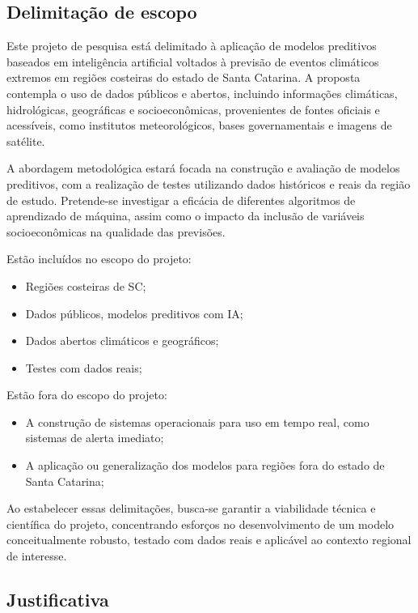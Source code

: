 \subsection{Delimitação de escopo}
\label{sec:escopo}

Este projeto de pesquisa está delimitado à aplicação de modelos preditivos baseados em inteligência artificial voltados à previsão de eventos climáticos extremos em regiões costeiras do estado de Santa Catarina. A proposta contempla o uso de dados públicos e abertos, incluindo informações climáticas, hidrológicas, geográficas e socioeconômicas, provenientes de fontes oficiais e acessíveis, como institutos meteorológicos, bases governamentais e imagens de satélite.

A abordagem metodológica estará focada na construção e avaliação de modelos preditivos, com a realização de testes utilizando dados históricos e reais da região de estudo. Pretende-se investigar a eficácia de diferentes algoritmos de aprendizado de máquina, assim como o impacto da inclusão de variáveis socioeconômicas na qualidade das previsões.

Estão incluídos no escopo do projeto:

\begin{itemize}
  \item Regiões costeiras de SC;
  \item Dados públicos, modelos preditivos com IA;
  \item Dados abertos climáticos e geográficos;
  \item Testes com dados reais;
\end{itemize}

Estão fora do escopo do projeto:

\begin{itemize}
  \item A construção de sistemas operacionais para uso em tempo real, como sistemas de alerta imediato;
  \item A aplicação ou generalização dos modelos para regiões fora do estado de Santa Catarina;
\end{itemize}

Ao estabelecer essas delimitações, busca-se garantir a viabilidade técnica e científica do projeto, concentrando esforços no desenvolvimento de um modelo conceitualmente robusto, testado com dados reais e aplicável ao contexto regional de interesse.

\subsection{Justificativa}
\label{sec:justificativa}

